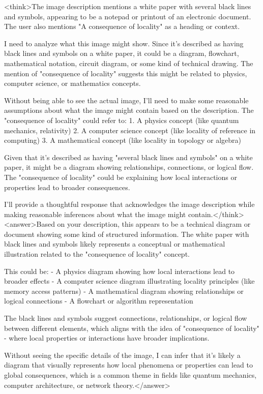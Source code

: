 <think>The image description mentions a white paper with several black lines and symbols, appearing to be a notepad or printout of an electronic document. The user also mentions "A consequence of locality" as a heading or context.

I need to analyze what this image might show. Since it's described as having black lines and symbols on a white paper, it could be a diagram, flowchart, mathematical notation, circuit diagram, or some kind of technical drawing. The mention of "consequence of locality" suggests this might be related to physics, computer science, or mathematics concepts.

Without being able to see the actual image, I'll need to make some reasonable assumptions about what the image might contain based on the description. The "consequence of locality" could refer to:
1. A physics concept (like quantum mechanics, relativity)
2. A computer science concept (like locality of reference in computing)
3. A mathematical concept (like locality in topology or algebra)

Given that it's described as having "several black lines and symbols" on a white paper, it might be a diagram showing relationships, connections, or logical flow. The "consequence of locality" could be explaining how local interactions or properties lead to broader consequences.

I'll provide a thoughtful response that acknowledges the image description while making reasonable inferences about what the image might contain.</think><answer>Based on your description, this appears to be a technical diagram or document showing some kind of structured information. The white paper with black lines and symbols likely represents a conceptual or mathematical illustration related to the "consequence of locality" concept.

This could be:
- A physics diagram showing how local interactions lead to broader effects
- A computer science diagram illustrating locality principles (like memory access patterns)
- A mathematical diagram showing relationships or logical connections
- A flowchart or algorithm representation

The black lines and symbols suggest connections, relationships, or logical flow between different elements, which aligns with the idea of "consequence of locality" - where local properties or interactions have broader implications.

Without seeing the specific details of the image, I can infer that it's likely a diagram that visually represents how local phenomena or properties can lead to global consequences, which is a common theme in fields like quantum mechanics, computer architecture, or network theory.</answer>